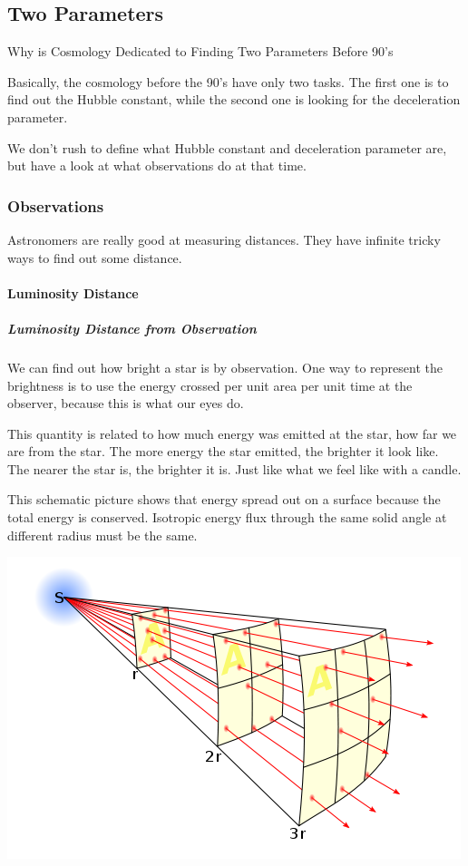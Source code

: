 \documentclass[letterpaper,10pt,english]{sphinxmanual}
\begin{document}
\subsection{Two Parameters}
\label{Cosmology/cosmoIndex:two-parameters}
Why is Cosmology Dedicated to Finding Two Parameters Before 90's

Basically, the cosmology before the 90's have only two tasks. The first one is to find out the Hubble constant, while the second one is looking for the deceleration parameter.

We don't rush to define what Hubble constant and deceleration parameter are, but have a look at what observations do at that time.


\subsubsection{Observations}
\label{Cosmology/cosmoIndex:observations}
Astronomers are really good at measuring distances. They have infinite tricky ways to find out some distance.


\paragraph{Luminosity Distance}
\label{Cosmology/cosmoIndex:luminosity-distance}

\subparagraph{Luminosity Distance from Observation}
\label{Cosmology/cosmoIndex:luminosity-distance-from-observation}
We can find out how bright a star is by observation. One way to represent the brightness is to use the energy crossed per unit area per unit time at the observer, because this is what our eyes do.

This quantity is related to how much energy was emitted at the star, how far we are from the star. The more energy the star emitted, the brighter it look like. The nearer the star is, the brighter it is. Just like what we feel like with a candle.

This schematic picture shows that energy spread out on a surface because the total energy is conserved. Isotropic energy flux through the same solid angle at different radius must be the same.

{\hfill\includegraphics{InverseSquareLaw.png}\hfill}
\end{document}
